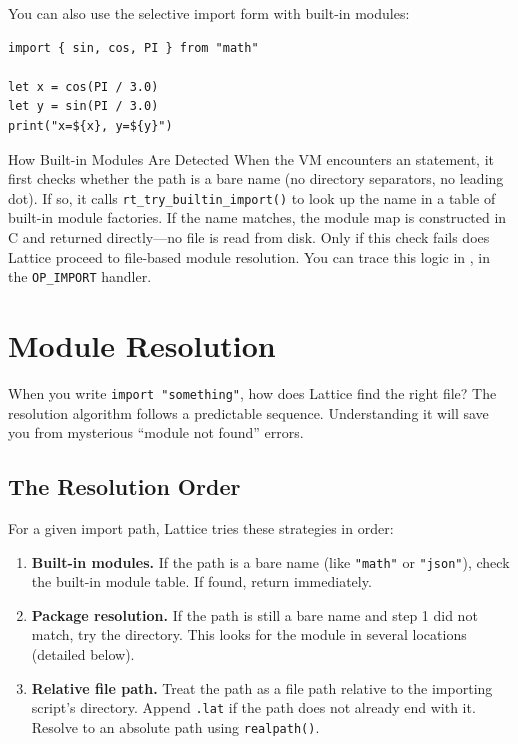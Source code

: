 You can also use the selective import form with built-in modules:

\begin{lstlisting}[language=Lattice, caption={Selective import from built-in modules}]
import { sin, cos, PI } from "math"

let x = cos(PI / 3.0)
let y = sin(PI / 3.0)
print("x=${x}, y=${y}")
\end{lstlisting}

\begin{notebox}{How Built-in Modules Are Detected}
When the VM encounters an  statement, it first checks whether the path is a bare name (no directory separators, no leading dot).
If so, it calls \lstinline|rt_try_builtin_import()| to look up the name in a table of built-in module factories.
If the name matches, the module map is constructed in C and returned directly---no file is read from disk.
Only if this check fails does Lattice proceed to file-based module resolution.
You can trace this logic in , in the \lstinline|OP_IMPORT| handler.
\end{notebox}

\section{Module Resolution}\label{sec:module-resolution}

When you write \lstinline|import "something"|, how does Lattice find the right file?
The resolution algorithm follows a predictable sequence.
Understanding it will save you from mysterious ``module not found'' errors.

\subsection{The Resolution Order}\label{subsec:resolution-order}

For a given import path, Lattice tries these strategies in order:

\begin{enumerate}
  \item \textbf{Built-in modules.} If the path is a bare name (like \lstinline|"math"| or \lstinline|"json"|), check the built-in module table.
  If found, return immediately.

  \item \textbf{Package resolution.} If the path is still a bare name and step 1 did not match, try the  directory.
  This looks for the module in several locations (detailed below).

  \item \textbf{Relative file path.} Treat the path as a file path relative to the importing script's directory.
  Append \texttt{.lat} if the path does not already end with it.
  Resolve to an absolute path using \lstinline|realpath()|.
\end{enumerate}

